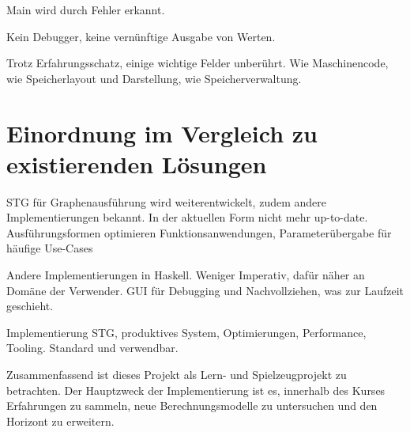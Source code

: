 Main wird durch Fehler erkannt.

Kein Debugger, keine vernünftige Ausgabe von Werten.

Trotz Erfahrungsschatz, einige wichtige Felder unberührt.
Wie Maschinencode, wie Speicherlayout und Darstellung, wie Speicherverwaltung.


\section{Einordnung im Vergleich zu existierenden Lösungen}

STG für Graphenausführung wird weiterentwickelt, zudem andere Implementierungen bekannt.
In der aktuellen Form nicht mehr up-to-date. Ausführungsformen optimieren Funktionsanwendungen, Parameterübergabe für häufige Use-Cases

Andere Implementierungen in Haskell.
Weniger Imperativ, dafür näher an Domäne der Verwender.
GUI für Debugging und Nachvollziehen, was zur Laufzeit geschieht.

Implementierung STG, produktives System, Optimierungen, Performance, Tooling.
Standard und verwendbar.

Zusammenfassend ist dieses Projekt als Lern- und Spielzeugprojekt zu betrachten.
Der Hauptzweck der Implementierung ist es, innerhalb des Kurses  Erfahrungen zu sammeln, neue Berechnungsmodelle zu untersuchen und den Horizont zu erweitern.

